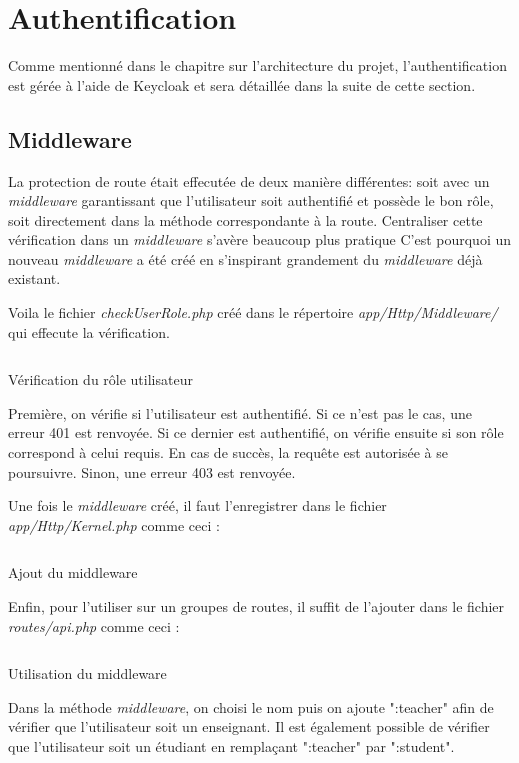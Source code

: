 \section{Authentification}
Comme mentionné dans le chapitre sur l'architecture du projet, l'authentification est gérée à l'aide de Keycloak et sera détaillée dans la suite de cette section.

\subsection{Middleware}
La protection de route était effecutée de deux manière différentes: soit avec un \emph{middleware} garantissant que l'utilisateur soit authentifié et possède le bon rôle, soit directement dans la méthode correspondante à la route. Centraliser cette vérification dans un \emph{middleware} s'avère beaucoup plus pratique C'est pourquoi un nouveau \emph{middleware} a été créé en s'inspirant grandement du \emph{middleware} déjà existant.

Voila le fichier \emph{checkUserRole.php} créé dans le répertoire \emph{app/Http/Middleware/} qui effecute la vérification.

\begin{listing}[H]
    \inputminted{php}{assets/code/checkUserRole.php}
    \caption{Vérification du rôle utilisateur}
\end{listing}

Première, on vérifie si l'utilisateur est authentifié. Si ce n'est pas le cas, une erreur 401 est renvoyée. Si ce dernier est authentifié, on vérifie ensuite si son rôle correspond à celui requis. En cas de succès, la requête est autorisée à se poursuivre. Sinon, une erreur 403 est renvoyée.

Une fois le \emph{middleware} créé, il faut l'enregistrer dans le fichier \emph{app/Http/Kernel.php} comme ceci :

\begin{listing}[H]
    \inputminted{php}{assets/code/addMiddleware.php}
    \caption{Ajout du middleware}
\end{listing}

Enfin, pour l'utiliser sur un groupes de routes, il suffit de l'ajouter dans le fichier \emph{routes/api.php} comme ceci :
\begin{listing}[H]
    \inputminted{php}{assets/code/middlewareRoutes.php}
    \caption{Utilisation du middleware}
\end{listing}

Dans la méthode \emph{middleware}, on choisi le nom puis on ajoute ":teacher" afin de vérifier que l'utilisateur soit un enseignant. Il est également possible de vérifier que l'utilisateur soit un étudiant en remplaçant ":teacher" par ":student".

